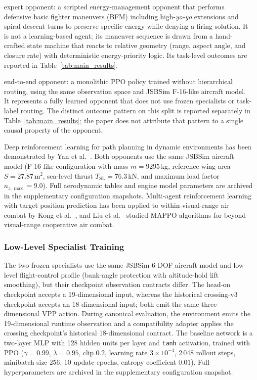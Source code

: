 \documentclass[5p,times]{elsarticle} %
\begin{document}
expert opponent: a scripted energy-management opponent that performs defensive basic fighter maneuvers (BFM) including high-\textit{yo-yo} extensions and spiral descent turns to preserve specific energy while denying a firing solution. It is not a learning-based agent; its maneuver sequence is drawn from a hand-crafted state machine that reacts to relative geometry (range, aspect angle, and closure rate) with deterministic energy-priority logic. Its task-level outcomes are reported in Table~\ref{tab:main_results}.

end-to-end opponent: a monolithic PPO policy trained without hierarchical routing, using the same observation space and JSBSim F-16-like aircraft model. It represents a fully learned opponent that does not use frozen specialists or task-label routing. The distinct outcome pattern on this split is reported separately in Table~\ref{tab:main_results}; the paper does not attribute that pattern to a single causal property of the opponent.

Deep reinforcement learning for path planning in dynamic environments has been demonstrated by Yan et al.~\cite{yan2020path}. Both opponents use the same JSBSim aircraft model (F-16-like configuration with mass $m = 9295$\,kg, reference wing area $S = 27.87$\,m$^2$, sea-level thrust $T_{\text{SL}} = 76.3$\,kN, and maximum load factor $n_{z,\max} = 9.0$). Full aerodynamic tables and engine model parameters are archived in the supplementary configuration snapshots. Multi-agent reinforcement learning with target position prediction has been applied to within-visual-range air combat by Kong et al.~\cite{kong2020mappo}, and Liu et al.~\cite{liu2022mappo} studied MAPPO algorithms for beyond-visual-range cooperative air combat.

\subsubsection{Low-Level Specialist Training}

The two frozen specialists use the same JSBSim 6-DOF aircraft model and low-level flight-control profile (bank-angle protection with altitude-hold lift smoothing), but their checkpoint observation contracts differ. The head-on checkpoint accepts a 19-dimensional input, whereas the historical crossing-v3 checkpoint accepts an 18-dimensional input; both emit the same three-dimensional VPP action. During canonical evaluation, the environment emits the 19-dimensional runtime observation and a compatibility adapter applies the crossing checkpoint's historical 18-dimensional contract. The baseline network is a two-layer MLP with 128 hidden units per layer and \texttt{tanh} activation, trained with PPO ($\gamma=0.99$, $\lambda=0.95$, clip $0.2$, learning rate $3\times 10^{-4}$, 2\,048 rollout steps, minibatch size 256, 10 update epochs, entropy coefficient $0.01$). Full hyperparameters are archived in the supplementary configuration snapshot.
\end{document}
